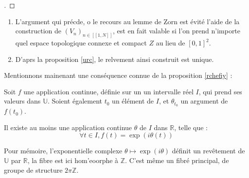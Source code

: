 \begin{proof}[\re]
\end{proof}

\begin{rema}
\begin{enumerate}
\item L'argument qui pr\'ecde, o le recours au lemme de Zorn est \'evit\'e  l'aide de la construction de $(V_n)_{n\in [\![1,N]\!]}$, %
est en fait valable si l'on prend n'importe quel espace topologique connexe et compact $Z$ au lieu de $[0,1]^2$.
\item D'aprs la proposition \ref{urc}, le relvement ainsi construit est unique.
\end{enumerate}
\end{rema}

\bigskip
Mentionnons mainenant une cons\'equence connue de la proposition \ref{rchefiy} :

\begin{prop}
Soit $f$ une application continue, d\'efinie sur un un intervalle r\'eel $I$, qui prend ses valeurs dans $\mathbb{U}$. %
Soient \'egalement $t_0$ un \'el\'ement de $I$, et $\theta_{t_0}$ un argument de $f(t_0)$.

\par
Il existe au moins une application continue $\theta$ de $I$ dans $\mathbb{R}$, telle que :
\[\forall t \in I, f(t)=\exp (i\theta (t))\]
\end{prop}

Pour m\'emoire, l'exponentielle complexe $\theta \mapsto \exp (i\theta )$ d\'efinit un rev\^etement de $\mathbb{U}$ par $\mathbb{R}$, %
la fibre est ici hom'eoorphe \`a $\mathbb{Z}$. C'est m\^eme un fibr\'e principal, de groupe de structure $2\pi\mathbb{Z}$.

